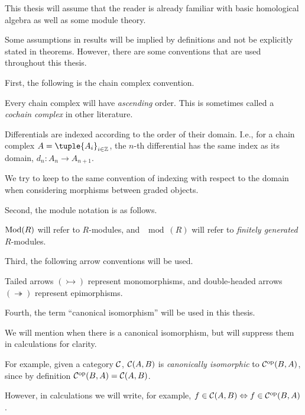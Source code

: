 This thesis will assume that the reader is already familiar with basic homological algebra as well as some module theory.

Some assumptions in results will be implied by definitions and not be explicitly stated in theorems. However, there are some conventions that are used throughout this thesis.

First, the following is the chain complex convention.
\begin{notation}
    \label{not:chain_complex}
    Every chain complex will have \emph{ascending} order. This is sometimes called a \emph{cochain complex} in other literature.

    Differentials are indexed according to the order of their domain. I.e., for a chain complex \( A = \tuple{A_i}_{i \in \Zb} \), the \( n \)-th differential has the same index as its domain, \( d_n: A_n \to A_{n + 1} \).
    
    We try to keep to the same convention of indexing with respect to the domain when considering morphisms between graded objects.
\end{notation}

Second, the module notation is as follows.
\begin{notation}
    \( \operatorname{Mod}(R) \) will refer to \( R \)-modules, and \( \mod(R) \) will refer to \emph{finitely generated} \( R \)-modules.
\end{notation}

Third, the following arrow conventions will be used.
\begin{notation}
    Tailed arrows \( (\rightarrowtail) \) represent monomorphisms, and double-headed arrows \( (\twoheadrightarrow) \) represent epimorphisms.
\end{notation}

Fourth, the term ``canonical isomorphism'' will be used in this thesis.
\begin{notation}
    We will mention when there is a canonical isomorphism, but will suppress them in calculations for clarity.

    For example, given a category \( {\mathcal{C}} \), \( {\mathcal{C}}(A, B) \) is \emph{canonically isomorphic} to \( {\mathcal{C}}^{\operatorname{op}}(B, A) \), since by definition \( {\mathcal{C}}^{\operatorname{op}}(B, A) = {\mathcal{C}}(A, B) \).

    However, in calculations we will write, for example, \( f \in {\mathcal{C}}(A, B) \Leftrightarrow f \in {\mathcal{C}}^{\operatorname{op}}(B, A) \).
\end{notation}

